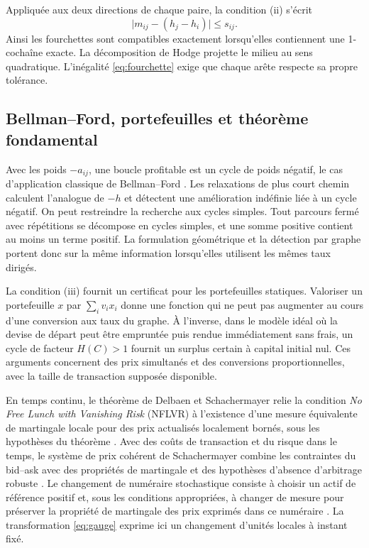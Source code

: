 \documentclass[11pt,a4paper]{article}
\theoremstyle{clair}
\begin{document}
Appliquée aux deux directions de chaque paire, la condition (ii) s'écrit
\begin{equation}
 \bigl|m_{ij}-(h_j-h_i)\bigr|\le s_{ij}.
 \label{eq:fourchette}
\end{equation}
Ainsi les fourchettes sont compatibles exactement lorsqu'elles contiennent une 1-cochaîne exacte. La décomposition de Hodge projette le milieu au sens quadratique. L'inégalité \eqref{eq:fourchette} exige que chaque arête respecte sa propre tolérance.

\clearpage
\subsection{Bellman--Ford, portefeuilles et théorème fondamental}

Avec les poids $-a_{ij}$, une boucle profitable est un cycle de poids négatif, le cas d'application classique de Bellman--Ford \cite{sedgewick}. Les relaxations de plus court chemin calculent l'analogue de $-h$ et détectent une amélioration indéfinie liée à un cycle négatif. On peut restreindre la recherche aux cycles simples. Tout parcours fermé avec répétitions se décompose en cycles simples, et une somme positive contient au moins un terme positif. La formulation géométrique et la détection par graphe portent donc sur la même information lorsqu'elles utilisent les mêmes taux dirigés.

La condition (iii) fournit un certificat pour les portefeuilles statiques. Valoriser un portefeuille $x$ par $\sum_i v_i x_i$ donne une fonction qui ne peut pas augmenter au cours d'une conversion aux taux du graphe. À l'inverse, dans le modèle idéal où la devise de départ peut être empruntée puis rendue immédiatement sans frais, un cycle de facteur $H(C)>1$ fournit un surplus certain à capital initial nul. Ces arguments concernent des prix simultanés et des conversions proportionnelles, avec la taille de transaction supposée disponible.

En temps continu, le théorème de Delbaen et Schachermayer relie la condition \emph{No Free Lunch with Vanishing Risk} (NFLVR) à l'existence d'une mesure équivalente de martingale locale pour des prix actualisés localement bornés, sous les hypothèses du théorème \cite{delbaen}. Avec des coûts de transaction et du risque dans le temps, le système de prix cohérent de Schachermayer combine les contraintes du bid--ask avec des propriétés de martingale et des hypothèses d'absence d'arbitrage robuste \cite{schachermayer}. Le changement de numéraire stochastique consiste à choisir un actif de référence positif et, sous les conditions appropriées, à changer de mesure pour préserver la propriété de martingale des prix exprimés dans ce numéraire \cite{geman}. La transformation \eqref{eq:gauge} exprime ici un changement d'unités locales à instant fixé.
\end{document}
